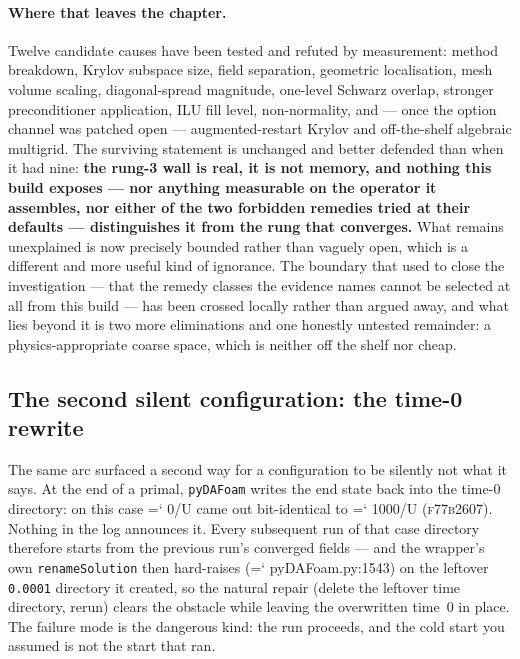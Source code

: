 \documentclass[11pt,a4paper]{article}
\newcommand{\artifact}[1]{{\small\ttfamily\hyphenchar\font=`\-\relax
  \def\_{\textunderscore\allowbreak}#1}}
\newcommand{\commit}[1]{\textsc{\small #1}}
\begin{document}
\paragraph{Where that leaves the chapter.} Twelve candidate causes have been tested and refuted by
measurement: method breakdown, Krylov subspace size, field separation, geometric localisation,
mesh volume scaling, diagonal-spread magnitude, one-level Schwarz overlap, stronger
preconditioner application, ILU fill level, non-normality, and --- once the option channel was
patched open --- augmented-restart Krylov and off-the-shelf algebraic multigrid. The surviving
statement is unchanged and better defended than when it had nine: \textbf{the rung-3 wall is
real, it is not memory, and nothing this build exposes --- nor anything measurable on the
operator it assembles, nor either of the two forbidden remedies tried at their defaults ---
distinguishes it from the rung that converges.} What remains unexplained is now precisely
bounded rather than vaguely open, which is a different and more useful kind of ignorance. The
boundary that used to close the investigation --- that the remedy classes the evidence names
cannot be selected at all from this build --- has been crossed locally rather than argued away,
and what lies beyond it is two more eliminations and one honestly untested remainder: a
physics-appropriate coarse space, which is neither off the shelf nor cheap.

\subsection{The second silent configuration: the time-0 rewrite}

The same arc surfaced a second way for a configuration to be silently not what it says. At the
end of a primal, \texttt{pyDAFoam} writes the end state back into the time-0 directory: on this
case \artifact{0/U} came out bit-identical to \artifact{1000/U} (\commit{f77b2607}). Nothing in the log announces
it. Every subsequent run of that case directory therefore starts from the previous run's
converged fields --- and the wrapper's own \texttt{renameSolution} then hard-raises
(\artifact{pyDAFoam.py:1543}) on the leftover \texttt{0.0001} directory it created, so the
natural repair (delete the leftover time directory, rerun) clears the obstacle while leaving
the overwritten time~0 in place. The failure mode is the dangerous kind: the run proceeds, and
the cold start you assumed is not the start that ran.
\end{document}
